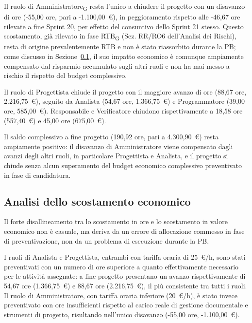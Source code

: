 Il ruolo di Amministratore\textsubscript{G} resta l'unico a chiudere il progetto con un
disavanzo di ore (-55,00 ore, pari a -1.100,00~\euro), in peggioramento
rispetto alle -46,67 ore rilevate a fine Sprint 20, per effetto del
consuntivo dello Sprint 21 stesso. Questo scostamento,
già rilevato in fase RTB\textsubscript{G} (Sez. RR/RO6 dell'Analisi dei
Rischi), resta di origine prevalentemente RTB e non è stato riassorbito
durante la PB; come discusso in Sezione~\ref{sec:scostamento-economico}, il
suo impatto economico è comunque ampiamente compensato dal risparmio
accumulato sugli altri ruoli e non ha mai messo a rischio il rispetto del
budget complessivo.

Il ruolo di Progettista chiude il progetto con il maggiore avanzo di ore
(88,67 ore, 2.216,75~\euro), seguito da Analista (54,67 ore, 1.366,75~\euro)
e Programmatore (39,00 ore, 585,00~\euro). Responsabile e Verificatore
chiudono rispettivamente a 18,58 ore (557,40~\euro) e 45,00 ore
(675,00~\euro).

Il saldo complessivo a fine progetto (190,92 ore, pari a 4.300,90~\euro)
resta ampiamente positivo: il disavanzo di Amministratore viene compensato
dagli avanzi degli altri ruoli, in particolare Progettista e Analista, e il
progetto si chiude senza alcun superamento del budget economico complessivo
preventivato in fase di candidatura.

\subsection{Analisi dello scostamento economico}
\label{sec:scostamento-economico}

Il forte disallineamento tra lo scostamento in ore e lo scostamento in
valore economico non è casuale, ma deriva da un errore di allocazione
commesso in fase di preventivazione, non da un problema
di esecuzione durante la PB.

I ruoli di Analista e Progettista, entrambi con tariffa oraria di 25~\euro/h,
sono stati preventivati con un numero di ore superiore a quanto
effettivamente necessario per le attività assegnate: a fine progetto
presentano un avanzo rispettivamente di 54,67 ore (1.366,75~\euro)
e 88,67 ore (2.216,75~\euro), il più consistente tra tutti i ruoli.
Il ruolo di Amministratore, con tariffa oraria inferiore (20~\euro/h), è
stato invece preventivato con ore insufficienti rispetto al carico reale di
gestione documentale e strumenti di progetto, risultando nell'unico disavanzo
(-55,00 ore, -1.100,00~\euro).

